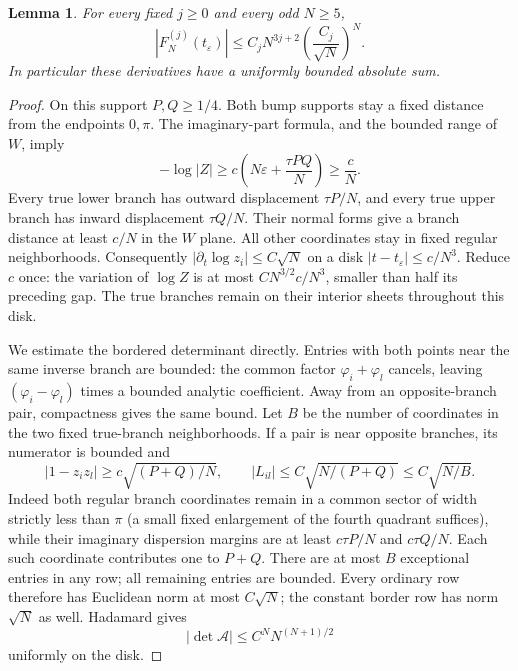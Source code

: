 \documentclass[11pt]{article}
\numberwithin{equation}{section}
\newtheorem{lemma}[theorem]{Lemma}
\theoremstyle{remark}\newtheorem{remark}[theorem]{Remark}
\begin{document}
\begin{lemma}\label{lem:constrained-selected}
For every fixed $j\ge0$ and every odd $N\ge5$,
\[
 |F_N^{(j)}(t_\varepsilon)|
    \le C_j N^{3j+2}\left(\frac{C_j}{\sqrt N}\right)^N.
\]
In particular these derivatives have a uniformly bounded absolute sum.
\end{lemma}
\begin{proof}
On this support $P,Q\ge1/4$.  Both bump supports stay a fixed
distance from the endpoints $0,\pi$.  The imaginary-part formula,
and the bounded range of $W$, imply
\[
 -\log|Z|\ge c\left(N\varepsilon+\frac{\tau PQ}{N}\right)
             \ge \frac cN.
\]
Every true lower branch has outward displacement $\tau P/N$,
and every true upper branch has inward displacement $\tau Q/N$.
Their normal forms give a branch distance at least $c/N$ in
the $W$ plane.  All other coordinates stay in fixed regular
neighborhoods.  Consequently $|\partial_t\log z_i|\le C\sqrt N$
on a disk $|t-t_\varepsilon|\le c/N^3$.  Reduce $c$ once: the
variation of $\log Z$ is at most $CN^{3/2}c/N^3$, smaller than
half its preceding gap.  The true branches remain on their interior
sheets throughout this disk.

We estimate the bordered determinant directly.
Entries with both points near the same inverse branch are bounded:
the common factor $\varphi_i+\varphi_l$ cancels, leaving
$(\varphi_i-\varphi_l)$ times a bounded analytic coefficient.
Away from an opposite-branch pair, compactness gives the same bound.
Let $B$ be the number of coordinates in the two fixed true-branch
neighborhoods.  If a pair is near opposite branches, its numerator
is bounded and
\[
 |1-z_i z_l|\ge c\sqrt{(P+Q)/N},\qquad
 |L_{il}|\le C\sqrt{N/(P+Q)}\le C\sqrt{N/B}.
\]
Indeed both regular branch coordinates remain in a common sector
of width strictly less than $\pi$ (a small fixed enlargement of the
fourth quadrant suffices), while their imaginary dispersion margins are
at least $c\tau P/N$ and $c\tau Q/N$.  Each such coordinate
contributes one to $P+Q$.  There are at most $B$ exceptional
entries in any row; all remaining entries are bounded.  Every ordinary row therefore has Euclidean norm at most
$C\sqrt N$; the constant border row has norm $\sqrt N$ as well.  Hadamard gives
\[
 |\det\mathcal A|\le C^N N^{(N+1)/2}
\]
uniformly on the disk.


\end{proof}
\end{document}
